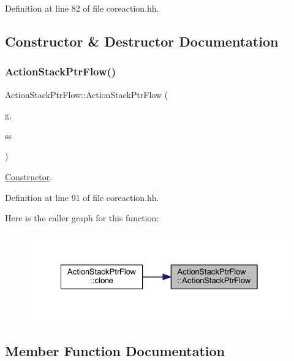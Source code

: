Definition at line 82 of file coreaction.\+hh.



\subsection{Constructor \& Destructor Documentation}
\mbox{\label{class_action_stack_ptr_flow_ade2bdc30e166fcb9f5e317bd7b9bae89}} 
\subsubsection{\texorpdfstring{ActionStackPtrFlow()}{ActionStackPtrFlow()}}
{\footnotesize\ttfamily Action\+Stack\+Ptr\+Flow\+::\+Action\+Stack\+Ptr\+Flow (\begin{DoxyParamCaption}\item[{const string \&}]{g,  }\item[{\mbox{\hyperlink{class_addr_space}{Addr\+Space}} $\ast$}]{ss }\end{DoxyParamCaption})\hspace{0.3cm}{\ttfamily [inline]}}



\mbox{\hyperlink{class_constructor}{Constructor}}. 



Definition at line 91 of file coreaction.\+hh.

Here is the caller graph for this function\+:
\nopagebreak
\begin{figure}[H]
\begin{center}
\leavevmode
\includegraphics[width=328pt]{class_action_stack_ptr_flow_ade2bdc30e166fcb9f5e317bd7b9bae89_icgraph}
\end{center}
\end{figure}


\subsection{Member Function Documentation}
\mbox{\label{class_action_stack_ptr_flow_a50ab249d10eef25f05e5e8de38786f7b}} 
